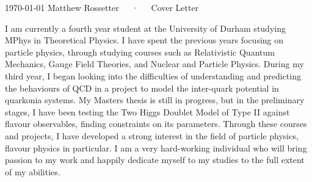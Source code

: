 \documentclass[11pt, a4paper]{awesome-cv}
\begin{document}
\makecvheader[R]

\makecvfooter
  {\today}
  {Matthew Rossetter~~~·~~~Cover Letter}
  {}

\makelettertitle

\begin{cvletter}

I am currently a fourth year student at the University of Durham studying MPhys in Theoretical Physics. 
I have spent the previous years focusing on particle physics, through studying courses such as Relativistic Quantum Mechanics, Gauge Field Theories, and Nuclear and Particle Physics. 
During my third year, I began looking into the difficulties of understanding and predicting the behaviours of QCD in a project to model the inter-quark potential in quarkonia systems.
My Masters thesis is still in progress, but in the preliminary stages, I have been testing the Two Higgs Doublet Model of Type II against flavour observables, finding constraints on its parameters. 
Through these courses and projects, I have developed a strong interest in the field of particle physics, flavour physics in particular. 
I am a very hard-working individual who will bring passion to my work and happily dedicate myself to my studies to the full extent of my abilities. 



\end{cvletter}
\end{document}
